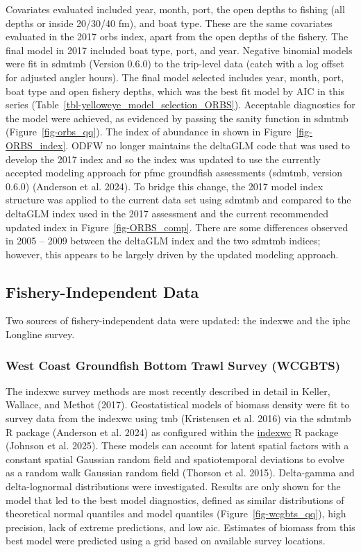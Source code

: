 \documentclass[
]{scrartcl}
\begin{document}
Covariates evaluated included year, month, port, the open depths to
fishing (all depths or inside 20/30/40 fm), and boat type. These are the
same covariates evaluated in the 2017 \gls{orbs} index, apart from the
open depths of the fishery. The final model in 2017 included boat type,
port, and year. Negative binomial models were fit in \gls{sdmtmb}
(Version 0.6.0) to the trip-level data (catch with a log offset for
adjusted angler hours). The final model selected includes year, month,
port, boat type and open fishery depths, which was the best fit model by
AIC in this series (Table~\ref{tbl-yelloweye_model_selection_ORBS}).
Acceptable diagnostics for the model were achieved, as evidenced by
passing the sanity function in \gls{sdmtmb} (Figure~\ref{fig-orbs_qq}).
The index of abundance in shown in Figure~\ref{fig-ORBS_index}. ODFW no
longer maintains the deltaGLM code that was used to develop the 2017
index and so the index was updated to use the currently accepted
modeling approach for \gls{pfmc} groundfish assessments (\gls{sdmtmb},
version 0.6.0) (Anderson et al. 2024). To bridge this change, the 2017
model index structure was applied to the current data set using
\gls{sdmtmb} and compared to the deltaGLM index used in the 2017
assessment and the current recommended updated index in
Figure~\ref{fig-ORBS_comp}. There are some differences observed in 2005
-- 2009 between the deltaGLM index and the two \gls{sdmtmb} indices;
however, this appears to be largely driven by the updated modeling
approach.

\subsection{Fishery-Independent Data}\label{fishery-independent-data}

Two sources of fishery-independent data were updated: the \gls{indexwc}
and the \gls{iphc} Longline survey.

\subsubsection{West Coast Groundfish Bottom Trawl Survey
(WCGBTS)}\label{west-coast-groundfish-bottom-trawl-survey-wcgbts}

The \gls{indexwc} survey methods are most recently described in detail
in Keller, Wallace, and Methot (2017). Geostatistical models of biomass
density were fit to survey data from the \gls{indexwc} using \gls{tmb}
(Kristensen et al. 2016) via the \gls{sdmtmb} R package (Anderson et al.
2024) as configured within the
\href{https://github.com/pfmc-assessments/indexwc}{indexwc} R package
(Johnson et al. 2025). These models can account for latent spatial
factors with a constant spatial Gaussian random field and spatiotemporal
deviations to evolve as a random walk Gaussian random field (Thorson et
al. 2015). Delta-gamma and delta-lognormal distributions were
investigated. Results are only shown for the model that led to the best
model diagnostics, defined as similar distributions of theoretical
normal quantiles and model quantiles (Figure~\ref{fig-wcgbts_qq}), high
precision, lack of extreme predictions, and low \gls{aic}. Estimates of
biomass from this best model were predicted using a grid based on
available survey locations.
\end{document}
